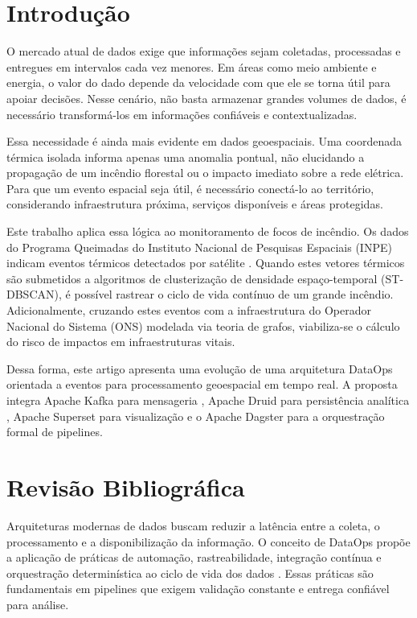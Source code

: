 \documentclass[12pt]{article}
\begin{document}
\section{Introdução}

O mercado atual de dados exige que informações sejam coletadas, processadas e entregues em intervalos cada vez menores. Em áreas como meio ambiente e energia, o valor do dado depende da velocidade com que ele se torna útil para apoiar decisões. Nesse cenário, não basta armazenar grandes volumes de dados, é necessário transformá-los em informações confiáveis e contextualizadas.

Essa necessidade é ainda mais evidente em dados geoespaciais. Uma coordenada térmica isolada informa apenas uma anomalia pontual, não elucidando a propagação de um incêndio florestal ou o impacto imediato sobre a rede elétrica. Para que um evento espacial seja útil, é necessário conectá-lo ao território, considerando infraestrutura próxima, serviços disponíveis e áreas protegidas.

Este trabalho aplica essa lógica ao monitoramento de focos de incêndio. Os dados do Programa Queimadas do Instituto Nacional de Pesquisas Espaciais (INPE) indicam eventos térmicos detectados por satélite \cite{inpe_queimadas}. Quando estes vetores térmicos são submetidos a algoritmos de clusterização de densidade espaço-temporal (ST-DBSCAN), é possível rastrear o ciclo de vida contínuo de um grande incêndio. Adicionalmente, cruzando estes eventos com a infraestrutura do Operador Nacional do Sistema (ONS) modelada via teoria de grafos, viabiliza-se o cálculo do risco de impactos em infraestruturas vitais.

Dessa forma, este artigo apresenta uma evolução de uma arquitetura DataOps orientada a eventos para processamento geoespacial em tempo real. A proposta integra Apache Kafka para mensageria \cite{apache_kafka}, Apache Druid para persistência analítica \cite{apache_druid}, Apache Superset para visualização \cite{apache_superset} e o Apache Dagster para a orquestração formal de pipelines.

\section{Revisão Bibliográfica}

Arquiteturas modernas de dados buscam reduzir a latência entre a coleta, o processamento e a disponibilização da informação. O conceito de DataOps propõe a aplicação de práticas de automação, rastreabilidade, integração contínua e orquestração determinística ao ciclo de vida dos dados \cite{ereth2018dataops}. Essas práticas são fundamentais em pipelines que exigem validação constante e entrega confiável para análise.
\end{document}
